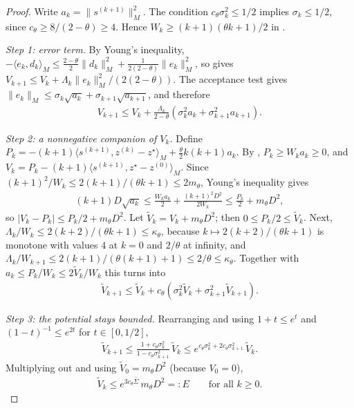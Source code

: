 \begin{proof}
    Write $a_k = \|s^{(k+1)}\|_M^2$.
    The condition $c_\theta\sigma_k^2 \le 1/2$ implies $\sigma_k \le 1/2$, since $c_\theta \ge 8/(2-\theta) \ge 4$.
    Hence $W_k \ge (k+1)(\theta k + 1)/2$ in .

    \emph{Step 1: error term.}
    By Young's inequality, $-\langle e_k, d_k\rangle_M \le \frac{2-\theta}{2}\|d_k\|_M^2 + \frac{1}{2(2-\theta)}\|e_k\|_M^2$, so  gives $V_{k+1} \le V_k + \Lambda_k\|e_k\|_M^2/(2(2-\theta))$.
    The acceptance test gives $\|e_k\|_M \le \sigma_k\sqrt{a_k} + \sigma_{k+1}\sqrt{a_{k+1}}$, and therefore
    \begin{align}
        V_{k+1} \le V_k + \frac{\Lambda_k}{2-\theta}\left(\sigma_k^2 a_k + \sigma_{k+1}^2 a_{k+1}\right). \label{eq:acc-step1}
    \end{align}

    \emph{Step 2: a nonnegative companion of $V_k$.}
    Define $P_k = -(k+1)\langle s^{(k+1)}, z^{(k)} - z^\star\rangle_M + \frac{\theta}{2}k(k+1)a_k$.
    By , $P_k \ge W_k a_k \ge 0$, and $V_k = P_k - (k+1)\langle s^{(k+1)}, z^\star - z^{(0)}\rangle_M$.
    Since $(k+1)^2/W_k \le 2(k+1)/(\theta k+1) \le 2m_\theta$, Young's inequality gives
    \begin{align}
        (k+1) D \sqrt{a_k} \le \frac{W_k a_k}{2} + \frac{(k+1)^2 D^2}{2 W_k} \le \frac{P_k}{2} + m_\theta D^2,
    \end{align}
    so $|V_k - P_k| \le P_k/2 + m_\theta D^2$.
    Let $\tilde V_k = V_k + m_\theta D^2$; then $0 \le P_k/2 \le \tilde V_k$.
    Next, $\Lambda_k/W_k \le 2(k+2)/(\theta k + 1) \le \kappa_\theta$, because $k \mapsto 2(k+2)/(\theta k+1)$ is monotone with values $4$ at $k=0$ and $2/\theta$ at infinity, and $\Lambda_k/W_{k+1} \le 2(k+1)/(\theta(k+1)+1) \le 2/\theta \le \kappa_\theta$.
    Together with $a_k \le P_k/W_k \le 2\tilde V_k/W_k$ this turns  into
    \begin{align}
        \tilde V_{k+1} \le \tilde V_k + c_\theta\left(\sigma_k^2 \tilde V_k + \sigma_{k+1}^2 \tilde V_{k+1}\right). \label{eq:acc-step2}
    \end{align}

    \emph{Step 3: the potential stays bounded.}
    Rearranging  and using $1 + t \le e^t$ and $(1-t)^{-1} \le e^{2t}$ for $t \in [0, 1/2]$,
    \begin{align}
        \tilde V_{k+1} \le \frac{1 + c_\theta\sigma_k^2}{1 - c_\theta\sigma_{k+1}^2}\, \tilde V_k \le e^{c_\theta\sigma_k^2 + 2c_\theta\sigma_{k+1}^2}\, \tilde V_k .
    \end{align}
    Multiplying out and using $\tilde V_0 = m_\theta D^2$ (because $V_0 = 0$),
    \begin{align}
        \tilde V_k \le e^{3 c_\theta \bar\Sigma}\, m_\theta D^2 =: E \qquad \text{for all } k \ge 0. \label{eq:acc-step3}
    \end{align}


\end{proof}
